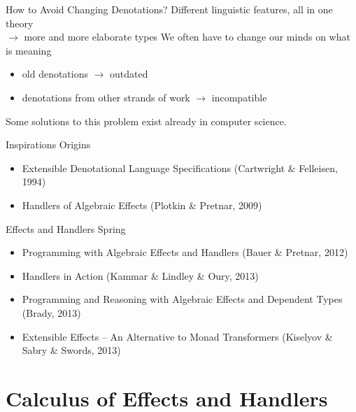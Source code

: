 \documentclass{beamer}
\begin{document}
\begin{frame}{How to Avoid Changing Denotations?}
  Different linguistic features, all in one theory \\
    $\rightarrow$ more and more elaborate types
  \vfill
  \pause
  We often have to change our minds on what is meaning
  \begin{itemize}
  \item old denotations $\rightarrow$ outdated
  \item denotations from other strands of work $\rightarrow$ incompatible
  \end{itemize}
  \pause
  \vfill
  Some solutions to this problem exist already in computer science.
\end{frame}


\begin{frame}{Inspirations}
  Origins
  \begin{itemize}
    \item Extensible Denotational Language Specifications (Cartwright \&
      Felleisen, 1994)
    \item Handlers of Algebraic Effects (Plotkin \& Pretnar, 2009)
  \end{itemize}
  \vfill
  \pause
  Effects and Handlers Spring
  \begin{itemize}
    \item Programming with Algebraic Effects and Handlers (Bauer \&
      Pretnar, 2012)
    \item Handlers in Action (Kammar \& Lindley \& Oury, 2013)
    \item Programming and Reasoning with Algebraic Effects and Dependent
      Types (Brady, 2013)
    \item Extensible Effects -- An Alternative to Monad Transformers
      (Kiselyov \& Sabry \& Swords, 2013)
  \end{itemize}
\end{frame}



\section{Calculus of Effects and Handlers}
\end{document}
